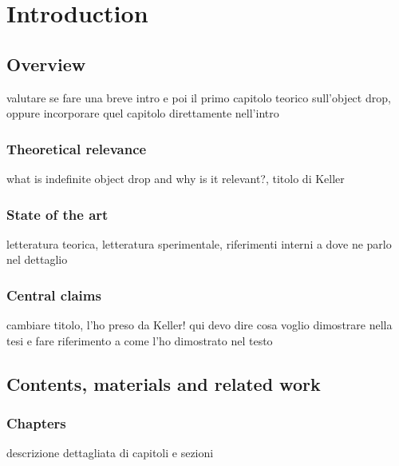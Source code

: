 \setchapterpreamble[u]{\margintoc}
\chapter{Introduction}

\section{Overview} 

 valutare se fare una breve intro e poi il primo capitolo teorico sull'object drop, oppure incorporare quel capitolo direttamente nell'intro

\subsection{Theoretical relevance}
what is indefinite object drop and why is it relevant?, titolo di Keller

\subsection{State of the art}
letteratura teorica, letteratura sperimentale, riferimenti interni a dove ne parlo nel dettaglio

\subsection{Central claims}
cambiare titolo, l'ho preso da Keller! qui devo dire cosa voglio dimostrare nella tesi e fare riferimento a come l'ho dimostrato nel testo


\section{Contents, materials and related work} 

\subsection{Chapters}
descrizione dettagliata di capitoli e sezioni


